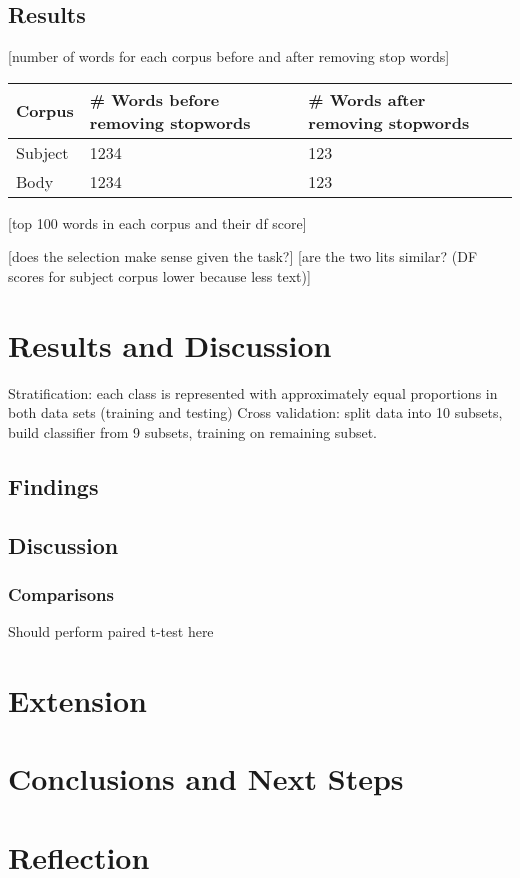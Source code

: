 \documentclass[12pt]{article}
\begin{document}
\subsection{Results}
[number of words for each corpus before and after removing stop words]
\begin{tabular}{ | l | l | l | }
\hline
Corpus & \# Words before removing stopwords & \# Words after removing stopwords\\ \hline
Subject & 1234 & 123  \\ \hline
Body & 1234 & 123 \\
\hline
\end{tabular}
[top 100 words in each corpus and their df score]

[does the selection make sense given the task?]
[are the two lits similar? (DF scores for subject corpus lower because less text)]

\section{Results and Discussion}
Stratification: each class is represented with approximately equal proportions in both data sets (training and testing)
Cross validation: split data into 10 subsets, build classifier from 9 subsets, training on remaining subset.

\subsection{Findings}
\subsection{Discussion}
\subsubsection{Comparisons}
Should perform paired t-test here
\section{Extension}

\section{Conclusions and Next Steps}

\section{Reflection}



\end{document}
